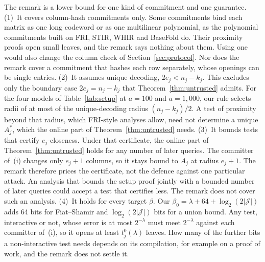  The remark is a lower bound for one kind of commitment and one guarantee.
(1)~It covers column-hash commitments only. Some commitments bind each matrix as one long codeword
or as one multilinear polynomial, as the polynomial commitments built on FRI, STIR, WHIR and
BaseFold do. Their proximity proofs open small leaves, and the remark says nothing about them.
Using one would also change the column check of Section~\ref{sec:protocol}. Nor does the remark
cover a commitment that hashes each row separately, whose openings can be single entries.
(2)~It assumes unique decoding, $2e_j<n_j-k_j$. This excludes only the boundary case
$2e_j=n_j-k_j$ that Theorem~\ref{thm:untrusted} admits. For the four models of
Table~\ref{tab:setup} at $a=100$ and $a=1{,}000$, our rule selects radii of at most \SetupRadiusMax{} of the
unique-decoding radius $(n_j-k_j)/2$. A test of proximity beyond that radius, which FRI-style
analyses allow, need not determine a unique $A^*_j$, which the online part of
Theorem~\ref{thm:untrusted} needs.
(3)~It bounds tests that certify $e_j$-closeness. Under that certificate, the online part of
Theorem~\ref{thm:untrusted} holds for any number of later queries. The committer of~(i) changes only
$e_j+1$ columns, so it stays bound to $A_j$ at radius $e_j+1$. The remark therefore prices the
certificate, not the defence against one particular attack. An analysis that bounds the setup proof
jointly with a bounded number of later queries could accept a test that certifies less. The remark
does not cover such an analysis.
(4)~It holds for every target $\beta$. Our $\beta_0=\lambda+64+\log_2(2|\mathcal J|)$ adds 64 bits
for Fiat--Shamir and $\log_2(2|\mathcal J|)$ bits for a union bound. Any test, interactive or not,
whose error is at most $2^{-\lambda}$ must meet $2^{-\lambda}$ against each committer of~(i), so it
opens at least $t^0_j(\lambda)$ leaves. How many of the further bits a non-interactive test needs
depends on its compilation, for example on a proof of work, and the remark does not settle it.
